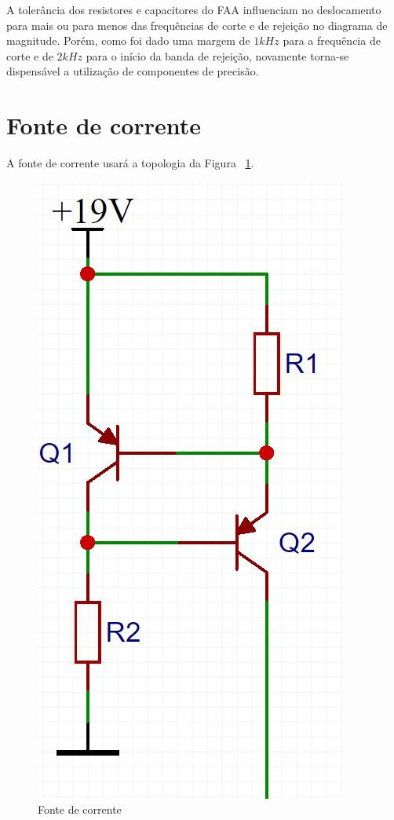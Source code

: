 \documentclass[
	12pt,				%
	openright,			%
	twoside,			%
	a4paper,			%
	english,			%
	french,				%
	spanish,			%
	brazil,				%
	]{abntex2}
\begin{document}
		A tolerância dos resistores e capacitores do FAA influenciam no
		deslocamento para mais ou para menos das frequências de corte e
		de rejeição no diagrama de magnitude. Porém, como foi dado uma
		margem de $1kHz$ para a frequência de corte e de $2kHz$ para o
		início da banda de rejeição, novamente torna-se dispensável a
		utilização de componentes de precisão.
		\newpage

	\section{Fonte de corrente}

		A fonte de corrente usará a topologia da Figura ~\ref{fig:topologiaFonteCorrente}.

		\begin{figure}[!ht]
			\centering
			\includegraphics[scale = 0.3]{../Fotos/fonteCorrenteClean2.jpg}
			\caption{Fonte de corrente}
			\label{fig:topologiaFonteCorrente}
		\end{figure}
\end{document}
